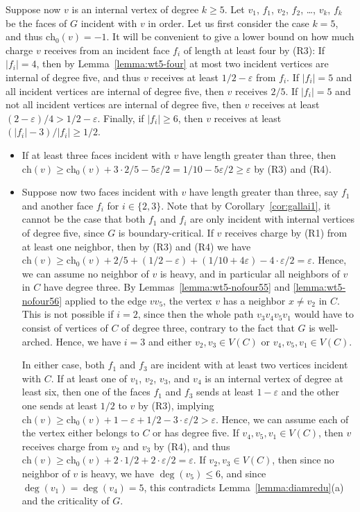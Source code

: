 \documentclass[12pt,twoside,openright,a4paper]{book}
\newcommand{\initch}{\text{ch}_0}
\newcommand{\finch}{\text{ch}}
\begin{document}
Suppose now $v$ is an internal vertex of degree $k\ge 5$.  Let $v_1$, $f_1$, $v_2$, $f_2$, \ldots, $v_k$, $f_k$ be the
faces of $G$ incident with $v$ in order.  Let us first consider the case $k=5$, and thus $\initch(v)=-1$.
It will be convenient to give a lower bound on how much charge $v$ receives from an incident face $f_i$ of length at least four by (R3):
If $|f_i|=4$, then by Lemma~\ref{lemma:wt5-four} at most two incident vertices are internal of degree five, and
thus $v$ receives at least $1/2-\varepsilon$ from $f_i$.  If $|f_i|=5$ and all incident vertices are internal of degree five,
then $v$ receives $2/5$.  If $|f_i|=5$ and not all incident vertices are internal of degree five, then $v$
receives at least $(2-\varepsilon)/4>1/2-\varepsilon$.  Finally, if $|f_i|\ge 6$, then $v$ receives at least
$(|f_i|-3)/|f_i|\ge 1/2$.
\begin{itemize}
\item If at least three faces incident with $v$ have length greater than three,
then $\finch(v)\ge \initch(v)+3\cdot 2/5-5\varepsilon/2=1/10-5\varepsilon/2\ge\varepsilon$ by (R3) and (R4).  
\item Suppose now two faces incident with $v$ have length greater than three, say $f_1$ and another face $f_i$ for $i\in\{2,3\}$.
Note that by Corollary~\ref{cor:gallai1}, it cannot be the case that both $f_1$ and $f_i$ are only incident with internal vertices
of degree five, since $G$ is boundary-critical.  If $v$ receives charge by (R1) from at least one neighbor, then by (R3) and (R4) we have
$\finch(v)\ge\initch(v)+2/5+(1/2-\varepsilon)+(1/10+4\varepsilon)-4\cdot \varepsilon/2=\varepsilon$.  Hence, we can assume no neighbor of $v$ is heavy,
and in particular all neighbors of $v$ in $C$ have degree three.
By Lemmas~\ref{lemma:wt5-nofour55} and \ref{lemma:wt5-nofour56} applied to the edge $vv_5$, the vertex $v$ has a neighbor $x\neq v_2$
in $C$.  This is not possible if $i=2$, since then the whole path $v_3v_4v_5v_1$ would have to consist of vertices of $C$ of degree
three, contrary to the fact that $G$ is well-arched.  Hence, we have $i=3$ and either $v_2,v_3\in V(C)$ or $v_4,v_5,v_1\in V(C)$.

In either case, both $f_1$ and $f_3$ are incident with at least two vertices incident with $C$.
If at least one of $v_1$, $v_2$, $v_3$, and $v_4$ is an internal vertex of degree at least six, then
one of the faces $f_1$ and $f_3$ sends at least $1-\varepsilon$ and the other one sends at least $1/2$ to
$v$ by (R3), implying $\finch(v)\ge\initch(v)+1-\varepsilon+1/2-3\cdot\varepsilon/2>\varepsilon$.
Hence, we can assume each of the vertex either belongs to $C$ or has degree five.  If $v_4,v_5,v_1\in V(C)$,
then $v$ receives charge from $v_2$ and $v_3$ by (R4), and thus $\finch(v)\ge\initch(v)+2\cdot 1/2+2\cdot\varepsilon/2=\varepsilon$.
If $v_2,v_3\in V(C)$, then since no neighbor of $v$ is heavy, we have $\deg(v_5)\le 6$, and since $\deg(v_1)=\deg(v_4)=5$,
this contradicts Lemma~\ref{lemma:diamredu}(a) and the criticality of $G$.


\end{itemize}
\end{document}
